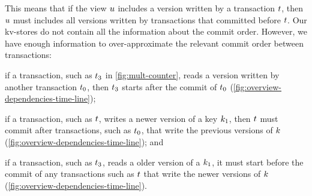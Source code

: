 This means that if the view \( u \) includes a version written by a transaction \( t \),
then \( u \) must includes all versions written by transactions that committed before \( t \).
Our kv-stores do not contain all the information about the commit order.
However, we have enough information to over-approximate the relevant commit order between transactions:
\begin{enumerate*}
\item if a transaction, such as \( t_3 \) in \cref{fig:mult-counter},
reads a version written by another transaction \( t_0 \),
then \( t_3 \) starts after the commit of \( t_0 \) (\cref{fig:overview-dependencies-time-line});
\item if a transaction, such as \( t \),
writes a newer version of a key \( k_1 \), 
then \( t \) must commit after transactions, such as \( t_0 \), that write the previous versions of \( k \) (\cref{fig:overview-dependencies-time-line}); and
\item if a transaction, such as \( t_3 \), reads a older version of a \( k_1 \),
it must start before the commit of any transactions such as \( t \) that write the newer versions of \( k \) (\cref{fig:overview-dependencies-time-line}).
\end{enumerate*}


